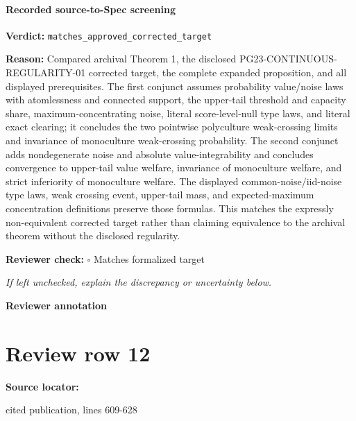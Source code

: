 \documentclass[10pt]{article}
\newcommand{\reviewerbox}{%
  \par\noindent\fbox{\parbox{0.96\linewidth}{\rule{0pt}{0.38in}}}\par
}
\newcommand{\reviewmatch}[1]{%
  \par\noindent\textbf{Reviewer check:} $\square$\; #1\par
  \noindent\emph{If left unchecked, explain the discrepancy or uncertainty below.}\par
}
\begin{document}
\paragraph{Recorded source-to-Spec screening}
\textbf{Verdict:} \texttt{matches\_approved\_corrected\_target}
\\
{\raggedright
\textbf{Reason:} Compared archival Theorem 1, the disclosed PG23-\allowbreak{}CONTINUOUS-\allowbreak{}REGULARITY-\allowbreak{}01 corrected target, the complete expanded proposition, and all displayed prerequisites.\allowbreak{} The first conjunct assumes probability value/\allowbreak{}noise laws with atomlessness and connected support, the upper-\allowbreak{}tail threshold and capacity share, maximum-\allowbreak{}concentrating noise, literal score-\allowbreak{}level-\allowbreak{}null type laws, and literal exact clearing;\allowbreak{} it concludes the two pointwise polyculture weak-\allowbreak{}crossing limits and invariance of monoculture weak-\allowbreak{}crossing probability.\allowbreak{} The second conjunct adds nondegenerate noise and absolute value-\allowbreak{}integrability and concludes convergence to upper-\allowbreak{}tail value welfare, invariance of monoculture welfare, and strict inferiority of monoculture welfare.\allowbreak{} The displayed common-\allowbreak{}noise/\allowbreak{}iid-\allowbreak{}noise type laws, weak crossing event, upper-\allowbreak{}tail mass, and expected-\allowbreak{}maximum concentration definitions preserve those formulas.\allowbreak{} This matches the expressly non-\allowbreak{}equivalent corrected target rather than claiming equivalence to the archival theorem without the disclosed regularity.\allowbreak{}
\par}
\reviewmatch{Matches formalized target}
\noindent\textbf{Reviewer annotation}\par
\reviewerbox
\clearpage
\hypertarget{source-claim-b67144632235af23}{}
\section*{Review row 12}
\textbf{Source locator:} {\footnotesize\raggedright cited publication, lines 609-\allowbreak{}628\par}
\end{document}
